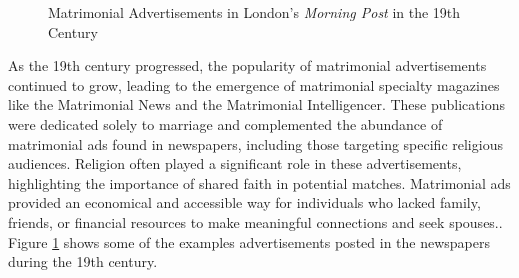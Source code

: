 \begin{figure}[t!]
\centering
    \hfill
    \caption{Matrimonial Advertisements in London’s \textit{Morning Post} in the 19th Century}
    \label{fig:img1}
\end{figure}

As the 19th century progressed, the popularity of matrimonial advertisements continued to grow, leading to the emergence of matrimonial specialty magazines like the Matrimonial News and the Matrimonial Intelligencer. These publications were dedicated solely to marriage and complemented the abundance of matrimonial ads found in newspapers, including those targeting specific religious audiences. Religion often played a significant role in these advertisements, highlighting the importance of shared faith in potential matches. Matrimonial ads provided an economical and accessible way for individuals who lacked family, friends, or financial resources to make meaningful connections and seek spouses.\cite{noauthor_alternative_2016}. Figure \ref{fig:img1} shows some of the examples advertisements posted in the newspapers during the 19th century. 

